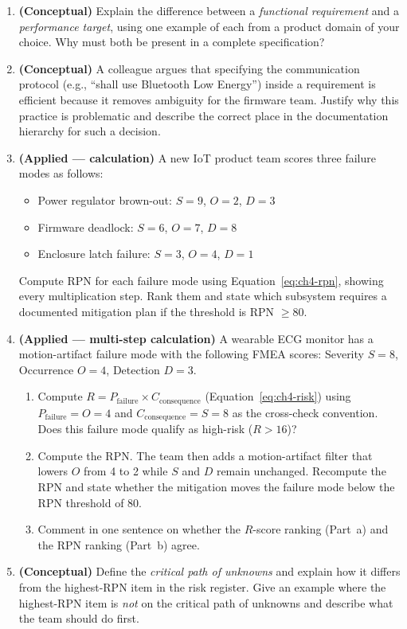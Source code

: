 \begin{enumerate}

  \item \textbf{(Conceptual)} Explain the difference between a \emph{functional requirement} and a \emph{performance target}, using one example of each from a product domain of your choice.
        Why must both be present in a complete specification?

  \item \textbf{(Conceptual)} A colleague argues that specifying the communication protocol (e.g., ``shall use Bluetooth Low Energy'') inside a requirement is efficient because it removes ambiguity for the firmware team.
        Justify why this practice is problematic and describe the correct place in the documentation hierarchy for such a decision.

  \item \textbf{(Applied — calculation)} A new IoT product team scores three failure modes as follows:
        \begin{itemize}
          \item Power regulator brown-out: $S = 9$, $O = 2$, $D = 3$
          \item Firmware deadlock: $S = 6$, $O = 7$, $D = 8$
          \item Enclosure latch failure: $S = 3$, $O = 4$, $D = 1$
        \end{itemize}
        Compute RPN for each failure mode using Equation~\eqref{eq:ch4-rpn}, showing every multiplication step.
        Rank them and state which subsystem requires a documented mitigation plan if the threshold is RPN $\geq 80$.

  \item \textbf{(Applied — multi-step calculation)} A wearable ECG monitor has a motion-artifact failure mode with the following FMEA scores: Severity $S = 8$, Occurrence $O = 4$, Detection $D = 3$.
        \begin{enumerate}
          \item[(a)] Compute $R = P_{\text{failure}} \times C_{\text{consequence}}$ (Equation~\ref{eq:ch4-risk}) using $P_{\text{failure}} = O = 4$ and $C_{\text{consequence}} = S = 8$ as the cross-check convention. Does this failure mode qualify as high-risk ($R > 16$)?
          \item[(b)] Compute the RPN. The team then adds a motion-artifact filter that lowers $O$ from 4 to 2 while $S$ and $D$ remain unchanged. Recompute the RPN and state whether the mitigation moves the failure mode below the RPN threshold of 80.
          \item[(c)] Comment in one sentence on whether the $R$-score ranking (Part~a) and the RPN ranking (Part~b) agree.
        \end{enumerate}

  \item \textbf{(Conceptual)} Define the \emph{critical path of unknowns} and explain how it differs from the highest-RPN item in the risk register.
        Give an example where the highest-RPN item is \emph{not} on the critical path of unknowns and describe what the team should do first.

\end{enumerate}

